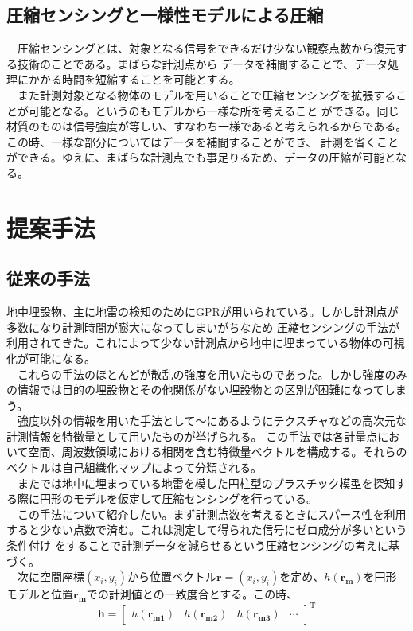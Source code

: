 \documentclass[12pt,a4paper]{jsreport}
\begin{document}
 \section{圧縮センシングと一様性モデルによる圧縮}
　圧縮センシングとは、対象となる信号をできるだけ少ない観察点数から復元する技術のことである。まばらな計測点から
データを補間することで、データ処理にかかる時間を短縮することを可能とする。
\\　また計測対象となる物体のモデルを用いることで圧縮センシングを拡張することが可能となる\cite{imai}。というのもモデルから一様な所を考えること
ができる。同じ材質のものは信号強度が等しい、すなわち一様であると考えられるからである。この時、一様な部分についてはデータを補間することができ、
計測を省くことができる。ゆえに、まばらな計測点でも事足りるため、データの圧縮が可能となる。

\chapter{提案手法}
\section{従来の手法}
地中埋設物、主に地雷の検知のためにGPRが用いられている。しかし計測点が多数になり計測時間が膨大になってしまいがちなため
圧縮センシングの手法が利用されてきた。これによって少ない計測点から地中に埋まっている物体の可視化が可能になる。
\\　これらの手法のほとんどが散乱の強度を用いたものであった。しかし強度のみの情報では目的の埋設物とその他関係がない埋設物との区別が困難になってしまう。
\\　強度以外の情報を用いた手法として\cite{hirose1}～\cite{hirose3}にあるようにテクスチャなどの高次元な計測情報を特徴量として用いたものが挙げられる。
この手法では各計量点において空間、周波数領域における相関を含む特徴量ベクトルを構成する。それらのベクトルは自己組織化マップによって分類される。
\\　また\cite{imai}では地中に埋まっている地雷を模した円柱型のプラスチック模型を探知する際に円形のモデルを仮定して圧縮センシングを行っている。
\\　この手法について紹介したい。まず計測点数を考えるときにスパース性を利用すると少ない点数で済む。これは測定して得られた信号にゼロ成分が多いという条件付け
をすることで計測データを減らせるという圧縮センシングの考えに基づく。
\\　次に空間座標$(x_{i},y_{i})$から位置ベクトル$\bm{r}=(x_{i},y_{i})$を定め、$h(\bm{r_{m}})$を円形モデルと位置$\bm{r_{m}}$での計測値との一致度合とする。この時、
\begin{equation}
  \bm{h} =
      \left[
      \begin{array}{rrrr}
      h(\bm{r_{m1}})&h(\bm{r_{m2}})&h(\bm{r_{m3}})&\cdots
      \end{array}
      \right]^\mathrm{T}
      \label{mbh}
  \end{equation}
\end{document}
